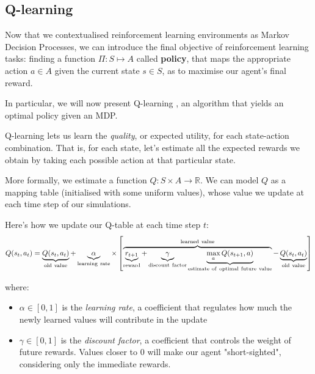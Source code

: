 \subsection{Q-learning}
\label{qlearning}
Now that we contextualised reinforcement learning environments as Markov Decision Processes, we can introduce the final objective of reinforcement learning tasks: finding a function $\Pi:S\mapsto A$ called \textbf{policy}, that maps the appropriate action $a\in A$ given the current state $s\in S$, as to maximise our agent's final reward.

In particular, we will now present Q-learning \parencite{watkins1992q}, an algorithm that yields an optimal policy given an MDP.

Q-learning lets us learn the \emph{quality}, or expected utility, for each state-action combination. That is, for each state, let's estimate all the expected rewards we obtain by taking each possible action at that particular state.

More formally, we estimate a function $Q: S \times A \to \mathbb{R}$. We can model $Q$ as a mapping table (initialised with some uniform values), whose value we update at each time step of our simulations.


Here's how we update our Q-table at each time step $t$:
  \[Q(s_{t},a_{t}) = \underbrace{Q(s_t,a_t)}_{\rm old~value} +
  \underbrace{\alpha}_{\rm learning~rate} \times \left[
    \overbrace{\underbrace{r_{t+1}}_{\rm reward} + \underbrace{\gamma}_{\rm
        discount~factor} \underbrace{\max_{a}Q(s_{t+1}, a)}_{\rm
        estimate~of~optimal~future~value}}^{\rm learned~value} -
    \underbrace{Q(s_t,a_t)}_{\rm old~value} \right] \]

%
%    
%   
where:
\begin{itemize}
	\item $\alpha\in[0,1]$ is the \emph{learning rate}, a coefficient that regulates how much the newly learned values will contribute in the update
	\item $\gamma\in[0,1]$ is the \emph{discount factor}, a coefficient that controls the weight of future rewards. Values closer to 0 will make our agent "short-sighted", considering only the immediate rewards.
\end{itemize}

